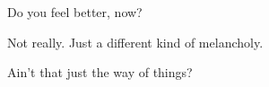 \begin{paracol}{2}
  \begin{leftcolumn}

\null
\vfill
\begin{ally}
Do you feel better, now?
\end{ally}

Not really. Just a different kind of melancholy.

\begin{ally}
Ain't that just the way of things?
\end{ally}
\vfill
\newpage

\end{leftcolumn}
\end{paracol}
